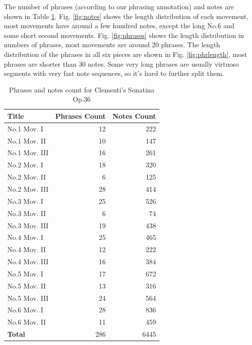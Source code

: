 The number of phrases (according to our phrasing annotation) and notes are shown in Table \ref{tab:clemcount}. Fig. \ref{fig:notes} shows the length distribution of each movement, most movements have around a few hundred notes, except the long No.6 and some short second movements. Fig. \ref{fig:phrases} shows the length distribution in numbers of phrases, most movements are around 20 phrases. The length distribution of the phrases in all six pieces are shown in Fig. \ref{fig:phrlength}, most phrases are shorter than 30 notes. Some very long phrases are usually virtuoso segments with very fast note sequences, so it's hard to further split them.

\begin{table}[bp]
   \centering
   \caption{Phrases and notes count for Clementi's Sonatina Op.36}
   \label{tab:clemcount}
   \begin{tabular}{l|rr}
      \hline
      \textbf{Title}&\textbf{Phrases Count}&\textbf{Notes Count}\\
      \hline
      No.1 Mov. I&12&222\\
      No.1 Mov. II&10&147\\
      No.1 Mov. III&16&261\\
      No.2 Mov. I&18&320\\
      No.2 Mov. II&6&125\\
      No.2 Mov. III&28&414\\
      No.3 Mov. I&25&526\\
      No.3 Mov. II&6&74\\
      No.3 Mov. III&19&438\\
      No.4 Mov. I&25&465\\
      No.4 Mov. II&12&222\\
      No.4 Mov. III&16&384\\
      No.5 Mov. I&17&672\\
      No.5 Mov. II&13&316\\
      No.5 Mov. III&24&564\\
      No.6 Mov. I&28&836\\
      No.6 Mov. II&11&459\\
      \hline
      \textbf{Total} &286&6445\\
      \hline
   \end{tabular}
\end{table}


